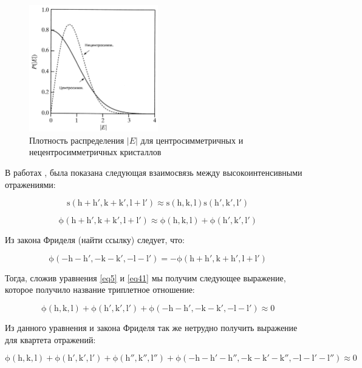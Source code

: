 \begin{figure}[H]
	\centering
	\includegraphics[width=0.5\textwidth]{figures/eimage.png}\hfill
	\caption{Плотность распределения $|E|$ для центросимметричных и нецентросимметричных кристаллов \cite{giacovazzo_international_2010}}
	\label{eimage}
\end{figure}




В работах \cite{sayre_squaring_1952}, \cite{cochran_relation_1952} была показана следующая взаимосвязь между высокоинтенсивными отражениями:

\begin{equation}\label{eq4}
\mathrm{ 
s(h+h', k+k', l+l') \approx s(h,k,l) s(h', k', l')}
\end{equation}


\begin{equation}\label{eq41}
\mathrm{
\phi(h+h', k+k', l+l')\approx \phi(h,k,l)+\phi(h',k',l')
}
\end{equation}

Из закона Фриделя (найти ссылку) следует, что:

\begin{equation}\label{eq5}
\mathrm{ 
\phi(-h-h',-k-k',-l-l') = -\phi(h+h', k+h', l+l')}
\end{equation}

Тогда, сложив уравнения \ref{eq5} и \ref{eq41} мы получим следующее выражение, которое получило название триплетное отношение:

\begin{equation}\label{eq6}
\mathrm{ 
\phi(h,k,l)+\phi(h',k',l') +\phi(-h-h',-k-k',-l-l')\approx 0}
\end{equation}

Из данного уравнения и закона Фриделя так же нетрудно получить выражение для квартета отражений:

\begin{equation}\label{eq7}
\mathrm{ 
\phi(h,k,l)+\phi(h',k',l') +\phi(h'',k'',l'')+\phi(-h-h'-h'',-k-k'-k'',-l-l'-l'')\approx 0}
\end{equation}


